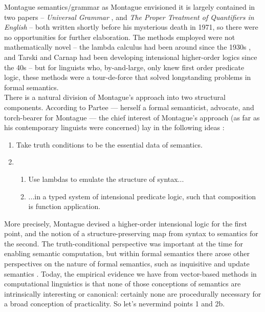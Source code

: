 Montague semantics/grammar as Montague envisioned it is largely contained in two papers -- \emph{Universal Grammar} \citep{montague1970universal}, and \emph{The Proper Treatment of Quantifiers in English} \citep{montague1973proper} -- both written shortly before his mysterious death in 1971, so there were no opportunities for further elaboration. The methods employed were not mathematically novel -- the lambda calculus had been around since the 1930s \citep{church_set_1933}, and Tarski and Carnap had been developing intensional higher-order logics since the 40s \citep{carnap_meaning_1988} -- but for linguists who, by-and-large, only knew first order predicate logic, these methods were a tour-de-force that solved longstanding problems in formal semantics.\\

There is a natural division of Montague's approach into two structural components. According to Partee --- herself a formal semanticist, advocate, and torch-bearer for Montague --- the chief interest of Montague's approach (as far as his contemporary linguists were concerned) lay in the following ideas \citep{portner_formal_2008}:

\begin{enumerate}
\item{Take truth conditions to be the essential data of semantics.}
\item{
\begin{enumerate}
\item{Use lambdas to emulate the structure of syntax...}
\item{...in a typed system of intensional predicate logic, such that composition is function application.}
\end{enumerate}}
\end{enumerate}

More precisely, Montague devised a higher-order intensional logic for the first point, and the notion of a structure-preserving map from syntax to semantics for the second. The truth-conditional perspective was important at the time for enabling semantic computation, but within formal semantics there arose other perspectives on the nature of formal semantics, such as inquisitive \citep{noauthor_inquisitive_nodate} and update semantics \citep{nouwen_dynamic_2022}. Today, the empirical evidence we have from vector-based methods in computational linguistics is that none of those conceptions of semantics are intrinsically interesting or canonical: certainly none are procedurally necessary for a broad conception of practicality. So let's nevermind points 1 and 2b.\\

